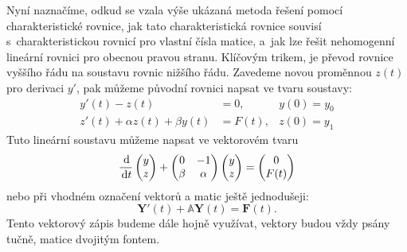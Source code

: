 \documentclass[a4paper, 12pt]{book}
\theoremstyle{definition}
\def\d{\,{\rm d}}               %
\def\vc#1{\mathbf{\boldsymbol{#1}}}     %
\def\tn#1{{\mathbb{#1}}}    %
\begin{document}
Nyní naznačíme, odkud se vzala výše ukázaná metoda řešení pomocí charakteristické rovnice, jak tato charakteristická rovnice souvisí s~charakteristickou rovnicí pro vlastní čísla matice,
a~jak lze řešit nehomogenní lineární rovnici pro obecnou pravou stranu. Klíčovým trikem, je převod rovnice vyššího řádu na soustavu rovnic nižšího řádu. Zavedeme novou proměnnou $z(t)$ pro derivaci $y'$,
pak můžeme původní rovnici napsat ve tvaru soustavy:
\begin{align}
   y'(t) - z(t) &= 0, & y(0) = y_0\\
   z'(t) + \alpha z(t) + \beta y(t) &= F(t), & z(0)= y_1
\end{align}
Tuto lineární soustavu můžeme napsat ve vektorovém tvaru
\[
    \frac{\d}{\d t}    
    \begin{pmatrix}
       y \\ z
    \end{pmatrix}
    +
    \begin{pmatrix}
        0  & -1\\
        \beta & \alpha
    \end{pmatrix}
    \begin{pmatrix}
        y \\ z
    \end{pmatrix}
    =
    \begin{pmatrix}
     0 \\ F(t)
    \end{pmatrix}
\]
nebo při vhodném označení vektorů a matic ještě jednodušeji:
\[
    \vc Y'(t) + \tn A \vc Y(t) = \vc F(t).
\]
Tento vektorový zápis budeme dále hojně využívat, vektory budou vždy psány tučně, matice dvojitým fontem.



\end{document}

